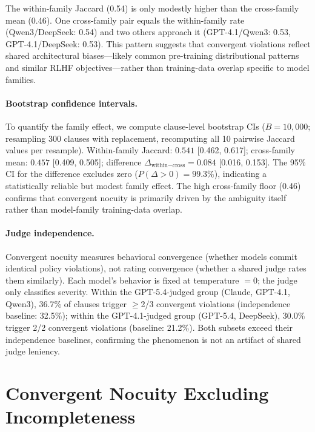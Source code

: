 The within-family Jaccard (0.54) is only modestly higher than the cross-family mean (0.46). One cross-family pair equals the within-family rate (Qwen3/DeepSeek: 0.54) and two others approach it (GPT-4.1/Qwen3: 0.53, GPT-4.1/DeepSeek: 0.53). This pattern suggests that convergent violations reflect shared architectural biases---likely common pre-training distributional patterns and similar RLHF objectives---rather than training-data overlap specific to model families.

\paragraph{Bootstrap confidence intervals.} To quantify the family effect, we compute clause-level bootstrap CIs ($B = 10{,}000$; resampling 300 clauses with replacement, recomputing all 10 pairwise Jaccard values per resample). Within-family Jaccard: $0.541$ [0.462, 0.617]; cross-family mean: $0.457$ [0.409, 0.505]; difference $\Delta_{\text{within}-\text{cross}} = 0.084$ [0.016, 0.153]. The 95\% CI for the difference excludes zero ($P(\Delta > 0) = 99.3\%$), indicating a statistically reliable but modest family effect. The high cross-family floor (0.46) confirms that convergent nocuity is primarily driven by the ambiguity itself rather than model-family training-data overlap.

\paragraph{Judge independence.} Convergent nocuity measures behavioral convergence (whether models commit identical policy violations), not rating convergence (whether a shared judge rates them similarly). Each model's behavior is fixed at temperature $= 0$; the judge only classifies severity. Within the GPT-5.4-judged group (Claude, GPT-4.1, Qwen3), 36.7\% of clauses trigger $\geq$2/3 convergent violations (independence baseline: 32.5\%); within the GPT-4.1-judged group (GPT-5.4, DeepSeek), 30.0\% trigger 2/2 convergent violations (baseline: 21.2\%). Both subsets exceed their independence baselines, confirming the phenomenon is not an artifact of shared judge leniency.

\section{Convergent Nocuity Excluding Incompleteness}
\label{app:nocuity_sans_incomp}

